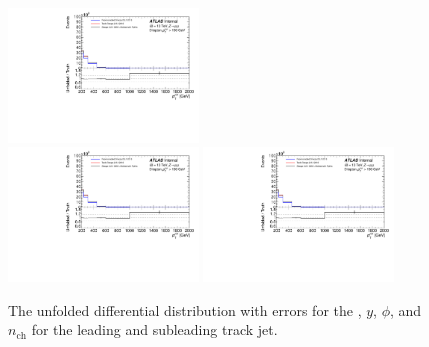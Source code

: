 \begin{figure}[h!]
  \includegraphics[page=844,width=0.45\textwidth]{figures/IBUPlots.pdf} \\
  \includegraphics[page=1044,width=0.45\textwidth]{figures/IBUPlots.pdf}
  \includegraphics[page=1084,width=0.45\textwidth]{figures/IBUPlots.pdf}
  \caption{The unfolded differential distribution with errors for the \pt, $y$, $\phi$, and $n_{\text{ch}}$ for the leading and subleading track jet.}
  \label{fig:unfoldErr2}
\end{figure}

